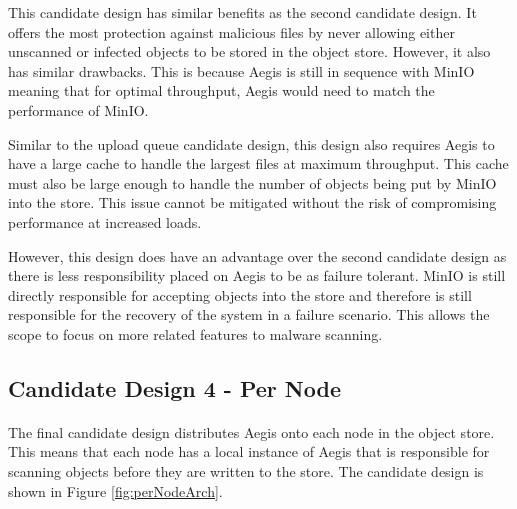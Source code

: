 \documentclass[12pt, conference, final, a4paper, onecolumn, compsoc]{IEEEtran}
\begin{document}
This candidate design has similar benefits as the second candidate design. It
offers the most protection against malicious files by never allowing either
unscanned or infected objects to be stored in the object store. However, it also
has similar drawbacks. This is because Aegis is still in sequence with MinIO
meaning that for optimal throughput, Aegis would need to match the performance
of MinIO.

Similar to the upload queue candidate design, this design also requires Aegis to
have a large cache to handle the largest files at maximum throughput. This cache
must also be large enough to handle the number of objects being put by MinIO
into the store. This issue cannot be mitigated without the risk of compromising
performance at increased loads.

However, this design does have an advantage over the second candidate design as
there is less responsibility placed on Aegis to be as failure tolerant. MinIO is
still directly responsible for accepting objects into the store and therefore is
still responsible for the recovery of the system in a failure scenario. This
allows the scope to focus on more related features to malware scanning.

\subsection{Candidate Design 4 - Per Node}
\paragraph{}

The final candidate design distributes Aegis onto each node in the object store.
This means that each node has a local instance of Aegis that is responsible for
scanning objects before they are written to the store. The candidate design is
shown in Figure \ref{fig:perNodeArch}.

\pagebreak
\end{document}
